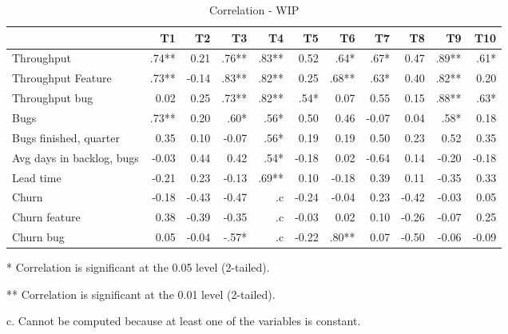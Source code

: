 \documentclass[UKenglish]{ifimaster}  %
\begin{document}
\begin{table}[!htbp]
 \begin{adjustwidth}{-1.5cm}{}
 \centering
 \begin{tabular}{|l|r|r|r|r|r|r|r|r|r|r|}
\hline
 & \bf{T1} & \bf{T2} & \bf{T3} & \bf{T4} & \bf{T5} & \bf{T6} & \bf{T7} & \bf{T8} & \bf{T9} & \bf{T10}\\ \hline
Throughput &.74**& 0.21& .76**& .83**& 0.52& .64*& .67*& 0.47& .89**& .61*\\ \hline
Throughput Feature &.73**& -0.14& .83**& .82**& 0.25& .68**& .63*& 0.40& .82**& 0.20\\ \hline
Throughput bug &0.02& 0.25& .73**& .82**& .54*& 0.07& 0.55& 0.15& .88**& .63*\\ \hline
Bugs &.73**& 0.20& .60*& .56*& 0.50& 0.46& -0.07& 0.04& .58*& 0.18\\ \hline
Bugs finished, quarter &0.35& 0.10& -0.07& .56*& 0.19& 0.19& 0.50& 0.23& 0.52& 0.35\\ \hline
Avg days in backlog, bugs &-0.03& 0.44& 0.42& .54*& -0.18& 0.02& -0.64& 0.14& -0.20& -0.18\\ \hline
Lead time &-0.21& 0.23& -0.13& .69**& 0.10& -0.18& 0.39& 0.11& -0.35& 0.33\\ \hline
Churn &-0.18& -0.43& -0.47& .c& -0.24& -0.04& 0.23& -0.42& -0.03& 0.05\\ \hline
Churn feature &0.38& -0.39& -0.35& .c& -0.03& 0.02& 0.10& -0.26& -0.07& 0.25\\ \hline
Churn bug &0.05& -0.04& -.57*
& .c
& -0.22& .80**
& 0.07& -0.50& -0.06& -0.09\\ \hline
\end{tabular}
 \caption{Correlation - WIP}
\label{corr:WIP}
 \centerline {* Correlation is significant at the 0.05 level (2-tailed).}
\centerline{** Correlation is significant at the 0.01 level (2-tailed).}
\centerline{c. Cannot be computed because at least one of the variables is constant.}
\end{adjustwidth}
\end{table}
\newpage
\end{document}
